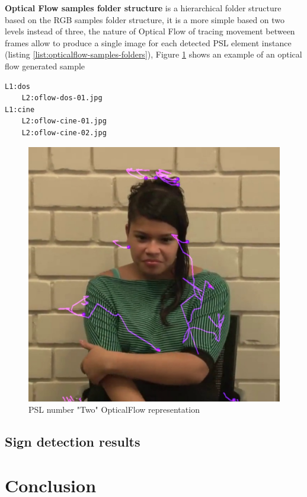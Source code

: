 \documentclass[twocolumn,conference]{article}
\begin{document}
\textbf{Optical Flow samples folder structure} is a hierarchical folder structure based on the RGB samples folder structure, it is a more simple based on two levels instead of three, the nature of Optical Flow of tracing movement between frames allow to produce a single image for each detected PSL element instance (listing \ref{list:opticalflow-samples-folders}), Figure \ref{fig:opticalflow-two} shows an example of an optical flow generated sample
\begin{lstlisting}[caption=Optical Flow Samples Folder Structure example, basicstyle=\ttfamily\small]
L1:dos
	L2:oflow-dos-01.jpg
L1:cine
	L2:oflow-cine-01.jpg
	L2:oflow-cine-02.jpg
\end{lstlisting}\label{list:opticalflow-samples-folders}
\begin{figure}[hbt!]
\includegraphics[width=\linewidth]{images/dos-opticalflow.jpg}
\caption{PSL number "Two" OpticalFlow representation}
\label{fig:opticalflow-two}
\end{figure}

\subsection{Sign detection results}

\section{Conclusion}\label{conclusion}



\end{document}
